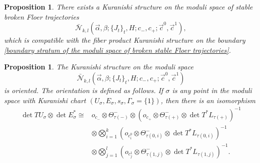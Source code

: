 \documentclass{amsart}
\newtheorem{proposition}[theorem]{Proposition}
\numberwithin{equation}{section}
\numberwithin{figure}{section}
\begin{document}
\begin{proposition}
	There exists a Kuranishi structure on the moduli space of stable broken Floer trajectories
\begin{equation*}
\bar{\mathcal{N}}_{k, l}(\vec{\alpha}, \beta; \{J_{t}\}_{t}, H; c_{-}, c_{+}; \vec{c}^{0}, \vec{c}^{1}),
\end{equation*}
which is compatible with the fiber product Kuranishi structure on the boundary \eqref{boundary stratum of the moduli space of broken stable Floer trajectories}.
\end{proposition}

\begin{proposition}
	The Kuranishi structure on the moduli space
\begin{equation*}
\bar{\mathcal{N}}_{k, l}(\vec{\alpha}, \beta; \{J_{t}\}_{t}, H; c_{-}, c_{+}; \vec{c}^{0}, \vec{c}^{1})
\end{equation*}
is oriented. The orientation is defined as follows. If $\sigma$ is any point in the moduli space with Kuranishi chart $(U_{\sigma}, E_{\sigma}, s_{\sigma}, \Gamma_{\sigma} = \{1\})$, then there is an isomorphism
\begin{equation}
\begin{split}
\det TU_{\sigma} \otimes \det E_{\sigma}^{*} \cong &o_{c_{-}} \otimes \Theta_{\tau(-)}^{-} \otimes (o_{c_{+}} \otimes \Theta_{\tau(+)}^{-} \otimes \det T^{*}L_{\tau(+)})^{-1}\\
&\otimes \bigotimes_{i=1}^{k} (o_{c^{0}_{i}} \otimes \Theta_{\tau(0, i)}^{-} \otimes \det T^{*}L_{\tau(0, i)})^{-1}\\
&\otimes \bigotimes_{j=1}^{l} (o_{c^{1}_{j}} \otimes \Theta_{\tau(1, j)}^{-} \otimes \det T^{*}L_{\tau(1, j)})^{-1}.
\end{split}
\end{equation}
\end{proposition}
\end{document}
